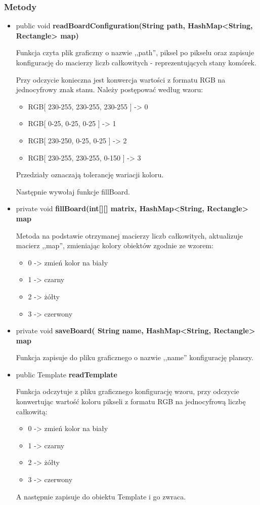 \documentclass[a4paper,11pt]{article}
\begin{document}
\subsubsection{Metody}
\begin{itemize}
\item public void \textbf{readBoardConfiguration(String path, HashMap<String, Rectangle> map)}

Funkcja czyta plik graficzny o nazwie ,,path'', piksel po pikselu oraz zapisuje konfigurację do macierzy liczb całkowitych - reprezentujących stany komórek. 

Przy odczycie konieczna jest konwercja wartości z formatu RGB na jednocyfrowy znak stanu. Należy postępować według wzoru:
\begin{itemize}
\item RGB[ 230-255, 230-255, 230-255 ] -> 0
\item RGB[ 0-25, 0-25, 0-25 ] -> 1
\item RGB[ 230-250, 0-25, 0-25 ] -> 2
\item RGB[ 230-255, 230-255, 0-150 ] -> 3
\end{itemize}

Przedziały oznaczają tolerancję wariacji koloru.

Następnie wywołaj funkcje fillBoard.

\item private void \textbf{fillBoard(int[][] matrix, HashMap<String, Rectangle> map}

Metoda na podstawie otrzymanej macierzy liczb całkowitych, aktualizuje macierz ,,map'', zmieniając kolory obiektów zgodnie ze wzorem:
\begin{itemize}
\item 0 -> zmień kolor na biały
\item 1 -> czarny
\item 2 -> żółty
\item 3 -> czerwony
\end{itemize}

\item private void \textbf{saveBoard( String name, HashMap<String, Rectangle> map }

Funkcja zapisuje do pliku graficznego o nazwie ,,name'' konfigurację planszy.
\item public Template \textbf{readTemplate}

Funkcja odczytuje z pliku graficznego konfigurację wzoru, przy odczycie konwertując wartość koloru pikseli z formatu RGB na jednocyfrową liczbę całkowitą:
\begin{itemize}
\item 0 -> zmień kolor na biały
\item 1 -> czarny
\item 2 -> żółty
\item 3 -> czerwony
\end{itemize}

A następnie zapisuje do obiektu Template i go zwraca. 
\end{itemize}
\end{document}
